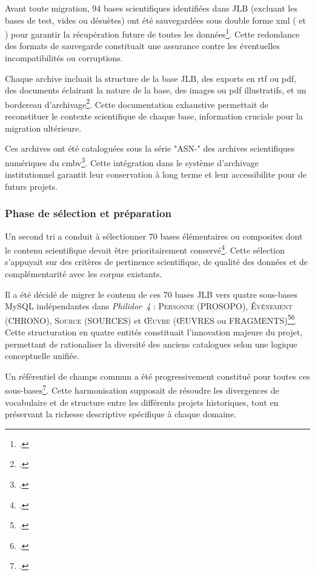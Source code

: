 Avant toute migration, 94 bases scientifiques identifiées dans JLB (excluant les bases de test, vides ou désuètes) ont été sauvegardées sous double forme \gls{xml} ( et ) pour garantir la récupération future de toutes les données\footcite{laurentguilloRapportMigrationAnciennes2022}. Cette redondance des formats de sauvegarde constituait une assurance contre les éventuelles incompatibilités ou corruptions.

Chaque archive incluait la structure de la base JLB, des exports en \gls{rtf} ou \gls{pdf}, des documents éclairant la nature de la base, des images ou \gls{pdf} illustratifs, et un bordereau d'archivage\footcite{laurentguilloRapportMigrationAnciennes2022}. Cette documentation exhaustive permettait de reconstituer le contexte scientifique de chaque base, information cruciale pour la migration ultérieure.

Ces archives ont été cataloguées sous la série "ASN-" des archives scientifiques numériques du \gls{cmbv}\footcite{laurentguilloRapportMigrationAnciennes2022}. Cette intégration dans le système d'archivage institutionnel garantit leur conservation à long terme et leur \gls{accessibilite} pour de futurs projets.

\subsubsection{Phase de sélection et préparation}

Un second tri a conduit à sélectionner 70 bases élémentaires ou composites dont le contenu scientifique devait être prioritairement conservé\footcite{laurentguilloRapportMigrationAnciennes2022}. Cette sélection s'appuyait sur des critères de pertinence scientifique, de qualité des données et de complémentarité avec les corpus existants.

Il a été décidé de migrer le contenu de ces 70 bases JLB vers quatre sous-bases MySQL indépendantes dans \textit{Philidor~4} : \textsc{Personne} (PROSOPO), \textsc{Événement} (CHRONO), \textsc{Source} (SOURCES) et \textsc{Œuvre} (ŒUVRES ou FRAGMENTS)\footcite{laurentguilloRapportMigrationAnciennes2022}\footcite{BaseDonneesPHILIDOR42024}. Cette structuration en quatre entités constituait l'innovation majeure du projet, permettant de rationaliser la diversité des anciens catalogues selon une logique conceptuelle unifiée.

Un référentiel de champs commun a été progressivement constitué pour toutes ces sous-bases\footcite{laurentguilloRapportMigrationAnciennes2022}. Cette harmonisation supposait de résoudre les divergences de vocabulaire et de structure entre les différents projets historiques, tout en préservant la richesse descriptive spécifique à chaque domaine.

